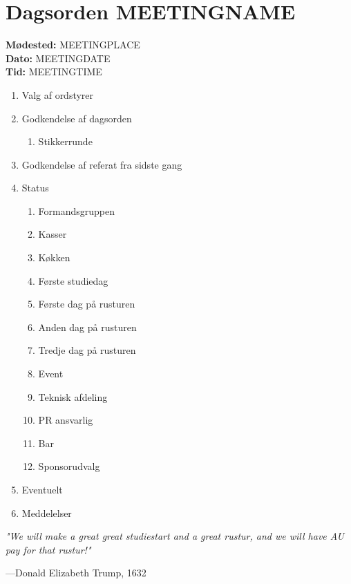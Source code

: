 

\newcommand{\meeting}{MEETINGNAME}
\newcommand{\dato}{MEETINGDATE}
\newcommand{\tid}{MEETINGTIME}
\newcommand{\location}{MEETINGPLACE}



\section*{Dagsorden \meeting{}}
\textbf{Mødested:} \location{}\\
\textbf{Dato:} \dato{}\\
\textbf{Tid:} \tid{}

\begin{enumerate}
  \item Valg af ordstyrer
  \item Godkendelse af dagsorden
  \begin{enumerate}
    \item Stikkerrunde
  \end{enumerate}
  \item Godkendelse af referat fra sidste gang
  \item Status
  \begin{enumerate}
    \item Formandsgruppen
    \item Kasser
    \item Køkken
    \item Første studiedag
    \item Første dag på rusturen
    \item Anden dag på rusturen
    \item Tredje dag på rusturen
    \item Event
    \item Teknisk afdeling
    \item PR ansvarlig
    \item Bar
    \item Sponsorudvalg
  \end{enumerate}
  \item Eventuelt
  \item Meddelelser
\end{enumerate}





\vspace{2em}
\begin{minipage}{0.55\textwidth}
  \color{gray}\footnotesize\textit{"We will make a great great studiestart and a great rustur, and we will have AU pay for that rustur!"}

  \raggedleft\----Donald Elizabeth Trump, 1632
\end{minipage}


